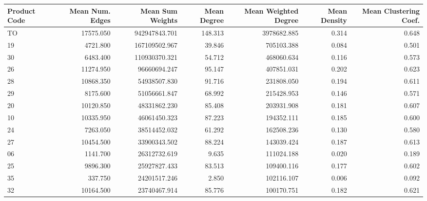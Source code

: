 \begin{tabular}{lrrrrrr}
\toprule
Product Code & Mean Num. Edges & Mean Sum Weights & Mean Degree & Mean Weighted Degree & Mean Density & Mean Clustering Coef. \\
\midrule
          TO &       17575.050 &    942947843.701 &     148.313 &          3978682.885 &        0.314 &                 0.648 \\
          19 &        4721.800 &    167109502.967 &      39.846 &           705103.388 &        0.084 &                 0.501 \\
          30 &        6483.400 &    110930370.321 &      54.712 &           468060.634 &        0.116 &                 0.573 \\
          26 &       11274.950 &     96660694.247 &      95.147 &           407851.031 &        0.202 &                 0.623 \\
          28 &       10868.350 &     54938507.830 &      91.716 &           231808.050 &        0.194 &                 0.611 \\
          29 &        8175.600 &     51056661.847 &      68.992 &           215428.953 &        0.146 &                 0.571 \\
          20 &       10120.850 &     48331862.230 &      85.408 &           203931.908 &        0.181 &                 0.607 \\
          10 &       10335.950 &     46061450.323 &      87.223 &           194352.111 &        0.185 &                 0.600 \\
          24 &        7263.050 &     38514452.032 &      61.292 &           162508.236 &        0.130 &                 0.580 \\
          27 &       10454.500 &     33900343.502 &      88.224 &           143039.424 &        0.187 &                 0.613 \\
          06 &        1141.700 &     26312732.619 &       9.635 &           111024.188 &        0.020 &                 0.189 \\
          25 &        9896.300 &     25927827.433 &      83.513 &           109400.116 &        0.177 &                 0.602 \\
          35 &         337.750 &     24201517.246 &       2.850 &           102116.107 &        0.006 &                 0.092 \\
          32 &       10164.500 &     23740467.914 &      85.776 &           100170.751 &        0.182 &                 0.621 \\

\end{tabular}
